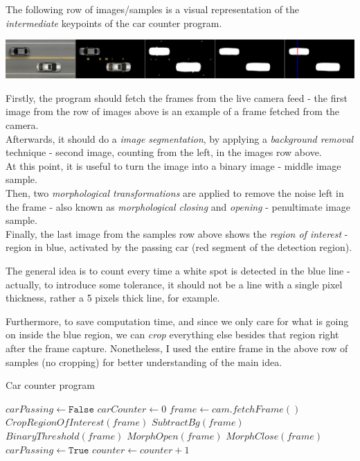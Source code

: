 The following row of images/samples is a visual representation of the \textit{intermediate} keypoints of the car counter program.

\begin{center}
    \includegraphics[width=\textwidth]{res/32.png}
\end{center}

Firstly, the program should fetch the frames from the live camera feed - the first image from the row of images above is an example of a frame fetched from the camera.\\
Afterwards, it should do a \textit{image segmentation}, by applying a \textit{background removal} technique - second image, counting from the left, in the images row above.\\
At this point, it is useful to turn the image into a binary image - middle image sample.\\
Then, two \textit{morphological transformations} are applied to remove the noise left in the frame - also known as \textit{morphological closing} and \textit{opening} - penultimate image sample.\\
Finally, the last image from the samples row above shows the \textit{region of interest} - region in blue, activated by the passing car (red segment of the detection region).

The general idea is to count every time a white spot is detected in the blue line - actually, to introduce some tolerance, it should not be a line with a single pixel thickness, rather a 5 pixels thick line, for example.

Furthermore, to save computation time, and since we only care for what is going on inside the blue region, we can \textit{crop} everything else besides that region right after the frame capture. Nonetheless, I used the entire frame in the above row of samples (no cropping) for better understanding of the main idea.

\begin{algorithm}
    \caption{Car counter program}\label{carCounterProg}
    \begin{algorithmic}[1]
            \State $ carPassing \leftarrow \texttt{False} $
            \State $ carCounter \leftarrow 0 $
            \Loop
                \State $ frame \leftarrow cam.fetchFrame() $
                \State $ CropRegionOfInterest(frame) $ 
                \State $ SubtractBg(frame) $
                \State $ BinaryThreshold(frame) $
                \State $ MorphOpen(frame) $
                \State $ MorphClose(frame) $
                        \State $ carPassing \leftarrow \texttt{True} $
                        \State $ counter \leftarrow counter + 1 $
                    \EndIf

    \end{algorithmic}
\end{algorithm}

